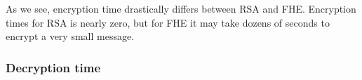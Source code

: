 
As we see, encryption time drastically differs between RSA and FHE. Encryption times for RSA is nearly zero, but for FHE it may take dozens of seconds to encrypt a very small message.

\subsubsection{Decryption time}

